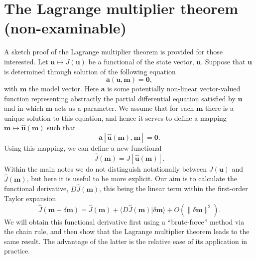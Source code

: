 \section*{The Lagrange multiplier theorem (non-examinable)}
A sketch proof of the Lagrange multiplier theorem is provided for those interested. Let $\mathbf{u}\mapsto J(\mathbf{u})$ be a functional of the state vector, $\mathbf{u}$. Suppose that $\mathbf{u}$ is determined through solution of the following equation
\begin{equation}
\mathbf{a}(\mathbf{u},\mathbf{m})=\mathbf{0},
\label{eq:44}
\end{equation}
with $\mathbf{m}$ the model vector. Here $\mathbf{a}$ is some potentially non-linear vector-valued function representing abstractly the partial differential equation satisfied by $\mathbf{u}$ and in which $\mathbf{m}$ acts as a parameter. We assume that for each $\mathbf{m}$ there is a unique solution to this equation, and hence it serves to define a mapping $\mathbf{m}\mapsto\hat{\mathbf{u}}(\mathbf{m})$ such that
\begin{equation}
\mathbf{a}[\hat{\mathbf{u}}(\mathbf{m}),\mathbf{m}]=\mathbf{0}.
\label{eq:45}
\end{equation}
Using this mapping, we can define a new functional
\begin{equation}
\hat{J}(\mathbf{m})=J[\hat{\mathbf{u}}(\mathbf{m})].
\label{eq:46}
\end{equation}
Within the main notes we do not distinguish notationally between $J(\mathbf{u})$ and $\hat{J}(\mathbf{m})$, but here it is useful to be more explicit. Our aim is to calculate the functional derivative, $D\hat{J}(\mathbf{m})$, this being the linear term within the first-order Taylor expansion
\begin{equation}
\hat{J}(\mathbf{m}+\delta \mathbf{m})=\hat{J}(\mathbf{m})+\langle D\hat{J}(\mathbf{m})|\delta \mathbf{m}\rangle+O(\|\delta \mathbf{m}\|^{2}).
\label{eq:47}
\end{equation}
We will obtain this functional derivative first using a ``brute-force'' method via the chain rule, and then show that the Lagrange multiplier theorem leads to the same result. The advantage of the latter is the relative ease of its application in practice.

